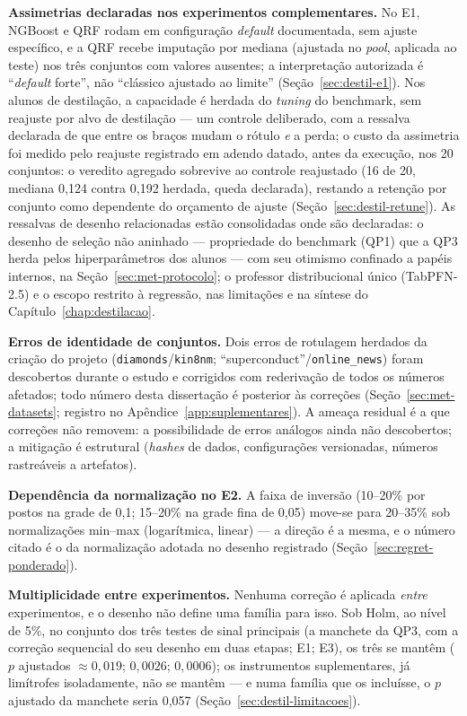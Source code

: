 \textbf{Assimetrias declaradas nos experimentos complementares.} No E1,
NGBoost e QRF rodam em configuração \emph{default} documentada, sem
ajuste específico, e a QRF recebe imputação por mediana (ajustada no
\emph{pool}, aplicada ao teste) nos três conjuntos com valores ausentes; a
interpretação autorizada é ``\emph{default} forte'', não ``clássico
ajustado ao limite'' (Seção~\ref{sec:destil-e1}). Nos alunos de
destilação, a capacidade é herdada do \emph{tuning} do benchmark, sem
reajuste por alvo de destilação --- um controle deliberado, com a
ressalva declarada de que entre os braços mudam o rótulo \emph{e} a
perda; o custo da assimetria foi medido pelo
reajuste registrado em adendo datado, antes da execução, nos 20
conjuntos: o
veredito agregado sobrevive ao controle reajustado (16 de 20, mediana
0,124 contra 0,192 herdada, queda declarada), restando a retenção por
conjunto como dependente do orçamento de ajuste
(Seção~\ref{sec:destil-retune}). As ressalvas de desenho
relacionadas estão consolidadas onde são declaradas: o desenho de
seleção não aninhado --- propriedade do benchmark (QP1) que a QP3
herda pelos hiperparâmetros dos alunos --- com seu otimismo
confinado a papéis internos, na Seção~\ref{sec:met-protocolo}; o
professor distribucional único (TabPFN-2.5) e o escopo restrito à
regressão, nas limitações e na síntese do
Capítulo~\ref{chap:destilacao}.

\textbf{Erros de identidade de conjuntos.} Dois erros de rotulagem
herdados da criação do projeto (\texttt{diamonds}/\texttt{kin8nm};
``superconduct''/\texttt{online\_news}) foram descobertos durante o
estudo e corrigidos com rederivação de todos os números afetados;
todo número desta dissertação é posterior às correções
(Seção~\ref{sec:met-datasets}; registro no
Apêndice~\ref{app:suplementares}). A ameaça residual é a que
correções não removem: a possibilidade de erros análogos ainda não
descobertos; a mitigação é estrutural (\emph{hashes} de dados,
configurações versionadas, números rastreáveis a artefatos).

\textbf{Dependência da normalização no E2.} A faixa de inversão
(10--20\% por postos na grade de 0,1; 15--20\% na grade fina de
0,05) move-se para 20--35\% sob normalizações
min--max (logarítmica, linear) --- a direção é a mesma, e o número
citado é o da normalização adotada no desenho registrado
(Seção~\ref{sec:regret-ponderado}).

\textbf{Multiplicidade entre experimentos.} Nenhuma correção é
aplicada \emph{entre} experimentos, e o desenho não define uma
família para isso. Sob Holm, ao nível de 5\%, no conjunto dos três
testes de sinal principais (a manchete da QP3, com a correção
sequencial do seu desenho em duas etapas; E1; E3), os três se mantêm
($p$ ajustados $\approx 0{,}019$; $0{,}0026$; $0{,}0006$); os
instrumentos suplementares, já limítrofes isoladamente, não se
mantêm --- e numa família que os incluísse, o $p$ ajustado da
manchete seria 0,057
(Seção~\ref{sec:destil-limitacoes}).

